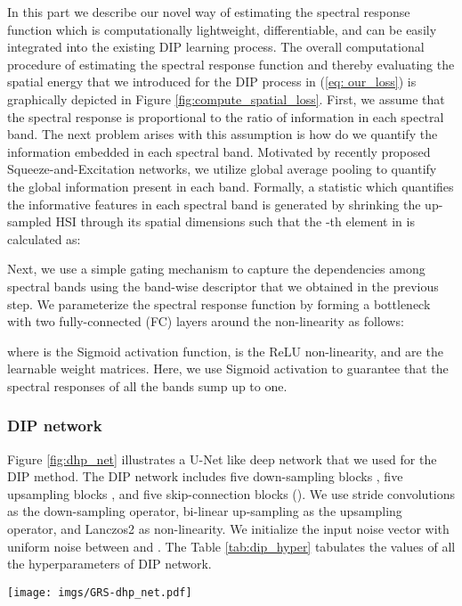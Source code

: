 \documentclass[journal]{IEEEtran}
\begin{document}
    \par In this part we describe our novel way of estimating the spectral response function which is computationally lightweight, differentiable, and can be easily integrated into the existing DIP learning process. The overall computational procedure of estimating the spectral response function and thereby evaluating the spatial energy that we introduced for the DIP process in (\ref{eq: our_loss}) is graphically depicted in Figure \ref{fig:compute_spatial_loss}. First, we assume that the spectral response is proportional to the ratio of information in each spectral band. The next problem arises with this assumption is how do we quantify the information embedded in each spectral band. Motivated by recently proposed Squeeze-and-Excitation networks, we utilize global average pooling to quantify the global information present in each band. Formally, a statistic   which quantifies the informative features in each spectral band is generated by shrinking the up-sampled HSI  through its spatial dimensions  such that the -th element in  is calculated as:
    
    Next, we use a simple gating mechanism to capture the dependencies among spectral bands using the band-wise descriptor  that we obtained in the previous step. We parameterize the spectral response function  by forming a bottleneck with two fully-connected (FC) layers around the non-linearity as follows:
    
    where  is the Sigmoid activation function,  is the ReLU non-linearity, and  are the learnable weight matrices. Here, we use Sigmoid activation to guarantee that the spectral responses of all the bands sump up to one.
    
    
\subsubsection{DIP network}
    \label{sec: DIP_network}
    \par Figure \ref{fig:dhp_net} illustrates a U-Net like deep network that we used for the DIP method. The DIP network includes five down-sampling blocks , five upsampling blocks , and five skip-connection blocks  (). We use stride convolutions as the down-sampling operator, bi-linear up-sampling as the upsampling operator, and Lanczos2 as non-linearity.  We initialize the input noise vector with uniform noise between  and . The Table \ref{tab:dip_hyper} tabulates the values of all the hyperparameters of DIP network.
    \begin{figure*}[tb]
        \centering
        \texttt{[image: imgs/GRS-dhp\_net.pdf]}
        \caption{The DIP network utilized for the up-sampling process. The DIP network is a U-Net like network which consists of five down-sampling blocks , five upsampling blocks , and five skip-connection blocks  (). The values of all the hyperparameters of DIP network is summarized in Table \ref{tab:dip_hyper}.}
        \label{fig:dhp_net}
    \end{figure*}
    
\end{document}
